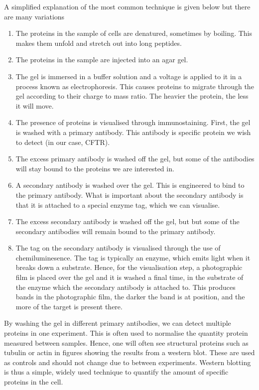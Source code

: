 A simplified explanation of the most common technique is given below but there are many variations
\begin{enumerate}
	\item The proteins in the sample of cells are denatured, sometimes by boiling. This makes them unfold and stretch out into long peptides. 
	\item The proteins in the sample are injected into an agar gel.
	\item The gel is immersed in a buffer solution and a voltage is applied to it in a process known as electrophoresis. This causes proteins to migrate through the gel according to their charge to mass ratio. The heavier the protein, the less it will move. 
	\item The presence of proteins is visualised through immunostaining. First, the gel is washed with a primary antibody. This antibody is specific protein we wish to detect (in our case, CFTR). 
	\item The excess primary antibody is washed off the gel, but some of the antibodies will stay bound to the proteins we are interested in. 
	\item A secondary antibody is washed over the gel. This is engineered to bind to the primary antibody. What is important about the secondary antibody is that it is attached to a special enzyme tag, which we can visualise.  
	\item The excess secondary antibody is washed off the gel, but but some of the secondary antibodies will remain bound to the primary antibody.
	\item The tag on the secondary antibody is visualised through the use of chemiluminesence. The tag is typically an enzyme, which emits light when it breaks down a substrate. Hence, for the visualisation step, a photographic film is placed over the gel and it is washed a final time, in the substrate of the enzyme which the secondary antibody is attached to. This produces bands in the photographic film, the darker the band is at position, and the more of the target is present there.
\end{enumerate}
By washing the gel in different primary antibodies, we can detect multiple proteins in one experiment. This is often used to normalise the quantity protein measured between samples. Hence, one will often see structural proteins such as tubulin or actin in figures showing the results from a western blot. These are used as controls and should not change due to between experiments. Western blotting is thus a simple, widely used technique to quantify the amount of specific proteins in the cell. 

